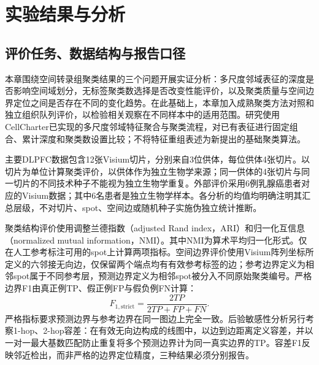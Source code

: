 \section{实验结果与分析}
\label{sec:cellcharter-results-v1}

\subsection{评价任务、数据结构与报告口径}
\label{subsec:cellcharter-design-v1}

本章围绕空间转录组聚类结果的三个问题开展实证分析：多尺度邻域表征的深度是否影响空间域划分，无标签聚类数选择是否改变性能评价，以及聚类质量与空间边界定位之间是否存在不同的变化趋势。在此基础上，本章加入成熟聚类方法对照和独立组织队列评价，以检验相关观察在不同样本中的适用范围。研究使用CellCharter已实现的多尺度邻域特征聚合与聚类流程，对已有表征进行固定组合、累计深度和聚类数设置比较；不将特征重组表述为新提出的基础聚类算法。

主要DLPFC数据包含12张Visium切片，分别来自3位供体，每位供体4张切片。以切片为单位计算聚类评价，以供体作为独立生物学来源；同一供体的4张切片与同一切片的不同技术种子不能视为独立生物学重复。外部评价采用6例乳腺癌患者对应的Visium数据；其中6名患者是独立生物学样本。各分析的均值均明确注明其汇总层级，不对切片、spot、空间边或随机种子实施伪独立统计推断。

聚类结构评价使用调整兰德指数（adjusted Rand index，ARI）和归一化互信息（normalized mutual information，NMI）。其中NMI为算术平均归一化形式。仅在人工参考标注可用的spot上计算两项指标。空间边界评价使用Visium阵列坐标所定义的六邻接无向边，仅保留两个端点均有有效参考标签的边；参考边界定义为相邻spot属于不同参考层，预测边界定义为相邻spot被分入不同原始聚类编号。严格边界F1由真正例TP、假正例FP与假负例FN计算：
\begin{equation}
F_{1,\mathrm{strict}}=\frac{2TP}{2TP+FP+FN}.
\label{eq:cellcharter-boundary-v1}
\end{equation}
严格指标要求预测边界与参考边界在同一图边上完全一致。后验敏感性分析另行考察1-hop、2-hop容差：在有效无向边构成的线图中，以边到边距离定义容差，并以一对一最大基数匹配防止重复将多个预测边界计为同一真实边界的TP。容差F1反映邻近检出，而非严格的边界定位精度，三种结果必须分别报告。

